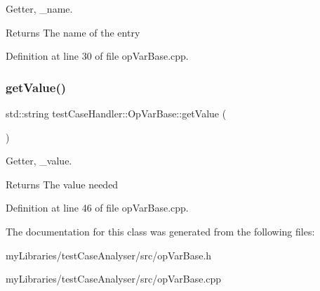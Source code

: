 Getter, \+\_\+name. 

\begin{DoxyReturn}{Returns}
The name of the entry 
\end{DoxyReturn}


Definition at line 30 of file op\+Var\+Base.\+cpp.

\mbox{\label{classtestCaseHandler_1_1OpVarBase_a3a35bbf670913c27a7ed98ef2a71e665}} 
\subsubsection{\texorpdfstring{getValue()}{getValue()}}
{\footnotesize\ttfamily std\+::string test\+Case\+Handler\+::\+Op\+Var\+Base\+::get\+Value (\begin{DoxyParamCaption}{ }\end{DoxyParamCaption})}



Getter, \+\_\+value. 

\begin{DoxyReturn}{Returns}
The value needed 
\end{DoxyReturn}


Definition at line 46 of file op\+Var\+Base.\+cpp.



The documentation for this class was generated from the following files\+:\begin{DoxyCompactItemize}
\item 
my\+Libraries/test\+Case\+Analyser/src/op\+Var\+Base.\+h\item 
my\+Libraries/test\+Case\+Analyser/src/op\+Var\+Base.\+cpp\end{DoxyCompactItemize}
